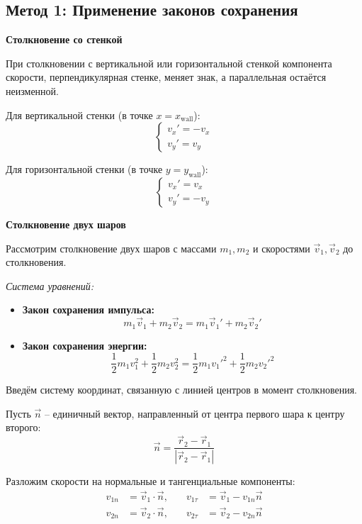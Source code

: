 \begin{center}
    \subsection{Метод 1: Применение законов сохранения}
\end{center}

\begin{center}
    \textbf{Столкновение со стенкой}
\end{center}

При столкновении с вертикальной или горизонтальной стенкой компонента скорости, перпендикулярная стенке, меняет знак, а параллельная остаётся неизменной.

Для вертикальной стенки (в точке $x = x_{\text{wall}}$):
\[
\begin{cases}
v_x' = -v_x \\
v_y' = v_y
\end{cases}
\]

Для горизонтальной стенки (в точке $y = y_{\text{wall}}$):
\[
\begin{cases}
v_x' = v_x \\
v_y' = -v_y
\end{cases}
\]

\begin{center}
    \textbf{Столкновение двух шаров}
\end{center}

Рассмотрим столкновение двух шаров с массами $m_1, m_2$ и скоростями $\vec{v}_1, \vec{v}_2$ до столкновения.

\textit{Система уравнений:}
\begin{itemize}
    \item \textbf{Закон сохранения импульса:}
    \[
    m_1\vec{v}_1 + m_2\vec{v}_2 = m_1\vec{v}_1' + m_2\vec{v}_2'
    \]

    \item \textbf{Закон сохранения энергии:}
    \[
    \frac{1}{2}m_1v_1^2 + \frac{1}{2}m_2v_2^2 = \frac{1}{2}m_1v_1'^2 + \frac{1}{2}m_2v_2'^2
    \]
\end{itemize}

\Solution Введём систему координат, связанную с линией центров в момент столкновения.

Пусть $\vec{n}$ -- единичный вектор, направленный от центра первого шара к центру второго:
\[
\vec{n} = \frac{\vec{r}_2 - \vec{r}_1}{|\vec{r}_2 - \vec{r}_1|}
\]

Разложим скорости на нормальные и тангенциальные компоненты:
\[
\begin{aligned}
v_{1n} &= \vec{v}_1 \cdot \vec{n}, & \quad v_{1\tau} &= \vec{v}_1 - v_{1n}\vec{n} \\
v_{2n} &= \vec{v}_2 \cdot \vec{n}, & \quad v_{2\tau} &= \vec{v}_2 - v_{2n}\vec{n}
\end{aligned}
\]


